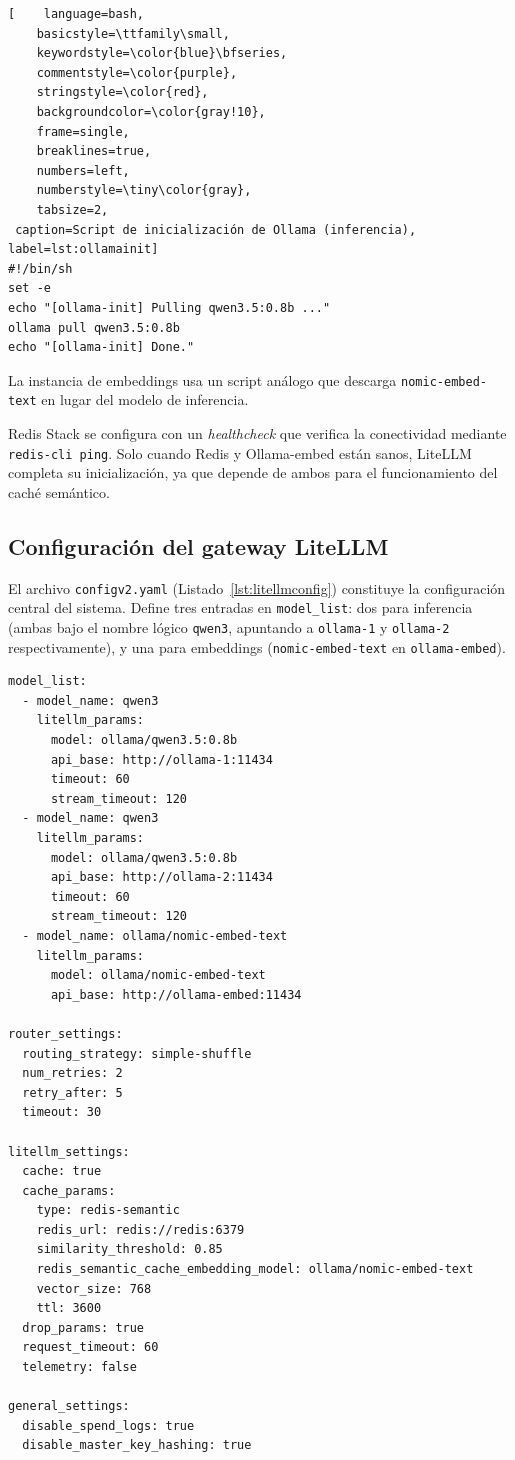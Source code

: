 \begin{lstlisting}[    language=bash,
    basicstyle=\ttfamily\small,
    keywordstyle=\color{blue}\bfseries,
    commentstyle=\color{purple},
    stringstyle=\color{red},
    backgroundcolor=\color{gray!10},
    frame=single,
    breaklines=true,
    numbers=left,
    numberstyle=\tiny\color{gray},
    tabsize=2, 
 caption=Script de inicialización de Ollama (inferencia), label=lst:ollamainit]
#!/bin/sh
set -e
echo "[ollama-init] Pulling qwen3.5:0.8b ..."
ollama pull qwen3.5:0.8b
echo "[ollama-init] Done."
\end{lstlisting}

La instancia de embeddings usa un script análogo que descarga \texttt{nomic-embed-text} en lugar del modelo de inferencia.

Redis Stack se configura con un \textit{healthcheck} que verifica la conectividad mediante \texttt{redis-cli ping}. Solo cuando Redis y Ollama-embed están sanos, LiteLLM completa su inicialización, ya que depende de ambos para el funcionamiento del caché semántico.

\subsection{Configuración del gateway LiteLLM}

El archivo \texttt{configv2.yaml} (Listado~\ref{lst:litellmconfig}) constituye la configuración central del sistema. Define tres entradas en \texttt{model\_list}: dos para inferencia (ambas bajo el nombre lógico \texttt{qwen3}, apuntando a \texttt{ollama-1} y \texttt{ollama-2} respectivamente), y una para embeddings (\texttt{nomic-embed-text} en \texttt{ollama-embed}).

\begin{lstlisting}[language=config3, caption=configv2.yaml --- Configuración de LiteLLM, label=lst:litellmconfig, basicstyle=\ttfamily\small, breaklines=true, frame=single, numbers=none]
model_list:
  - model_name: qwen3
    litellm_params:
      model: ollama/qwen3.5:0.8b
      api_base: http://ollama-1:11434
      timeout: 60
      stream_timeout: 120
  - model_name: qwen3
    litellm_params:
      model: ollama/qwen3.5:0.8b
      api_base: http://ollama-2:11434
      timeout: 60
      stream_timeout: 120
  - model_name: ollama/nomic-embed-text
    litellm_params:
      model: ollama/nomic-embed-text
      api_base: http://ollama-embed:11434

router_settings:
  routing_strategy: simple-shuffle
  num_retries: 2
  retry_after: 5
  timeout: 30

litellm_settings:
  cache: true
  cache_params:
    type: redis-semantic
    redis_url: redis://redis:6379
    similarity_threshold: 0.85
    redis_semantic_cache_embedding_model: ollama/nomic-embed-text
    vector_size: 768
    ttl: 3600
  drop_params: true
  request_timeout: 60
  telemetry: false

general_settings:
  disable_spend_logs: true
  disable_master_key_hashing: true
\end{lstlisting}

